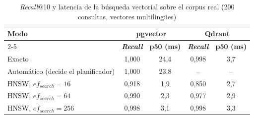 \begin{table}[htbp!]
    \centering
    \caption{\textit{Recall}@10 y latencia de la búsqueda vectorial sobre el corpus real (200 consultas, vectores multilingües)}
    \label{tab:res-ann-real}
    \begin{tabular}{|l|c|c|c|c|}
        \hline
        \multirow{2}{*}{\textbf{Modo}} & \multicolumn{2}{c|}{\textbf{pgvector}} & \multicolumn{2}{c|}{\textbf{Qdrant}} \\
        \cline{2-5}
         & \textbf{\textit{Recall}} & \textbf{p50 (ms)} & \textbf{\textit{Recall}} & \textbf{p50 (ms)} \\
        \hline
        Exacto & 1{,}000 & 24{,}4 & 0{,}998 & 3{,}7 \\
        \hline
        Automático (decide el planificador) & 1{,}000 & 23{,}8 & -- & -- \\
        \hline
        HNSW, $ef_{search} = 16$ & 0{,}918 & 1{,}9 & 0{,}850 & 2{,}7 \\
        \hline
        HNSW, $ef_{search} = 64$ & 0{,}990 & 2{,}3 & 0{,}977 & 2{,}9 \\
        \hline
        HNSW, $ef_{search} = 256$ & 0{,}998 & 3{,}1 & 0{,}998 & 3{,}3 \\
        \hline
    \end{tabular}
\end{table}
